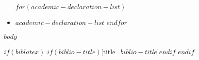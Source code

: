 \documentclass[
$if(fontsize)$
	$fontsize$,
$endif$
$if(lang)$
	$babel-lang$,
$endif$
$if(papersize)$
	$papersize$paper,
$endif$
$if(beamer)$
	ignorenonframetext,
$if(handout)$
	handout,
$endif$
$if(aspectratio)$
	aspectratio=$aspectratio$,
$endif$
$endif$
$for(classoption)$
	$classoption$$sep$,
$endfor$
]{$documentclass$}
\begin{document}
\begin{itemize}
$for(academic-declaration-list)$
	\item $academic-declaration-list$
$endfor$
\end{itemize}
\newpage

\hypersetup{pageanchor=true}
\pagestyle{fancy}
\fancyhf{}
\fancyhfoffset[L]{1cm} %
\fancyhfoffset[R]{1cm} %

\cfoot{\thepage}
\rfoot{}



$body$

\begin{appendix}
\end{appendix}


$if(biblatex)$
\printbibliography$if(biblio-title)$[title=$biblio-title$]$endif$
$endif$

\label{NumDocumentPages}
\end{document}
